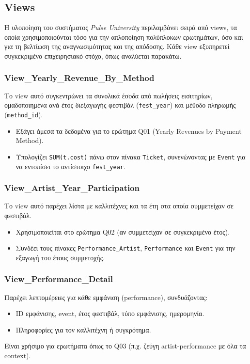 \documentclass[13pt]{extarticle}
\begin{document}
\subsection{Views}

Η υλοποίηση του συστήματος \textit{Pulse University} περιλαμβάνει σειρά από views, τα οποία χρησιμοποιούνται τόσο για την απλοποίηση πολύπλοκων ερωτημάτων, όσο και για τη βελτίωση της αναγνωσιμότητας και της απόδοσης. Κάθε view εξυπηρετεί συγκεκριμένο επιχειρησιακό στόχο, όπως αναλύεται παρακάτω.

\subsubsection{View\_Yearly\_Revenue\_By\_Method}

Το view αυτό συγκεντρώνει τα συνολικά έσοδα από πωλήσεις εισιτηρίων, ομαδοποιημένα ανά έτος διεξαγωγής φεστιβάλ (\texttt{fest\_year}) και μέθοδο πληρωμής (\texttt{method\_id}).

\begin{itemize}
    \item Εξάγει άμεσα τα δεδομένα για το ερώτημα Q01 (Yearly Revenues by Payment Method).
    \item Υπολογίζει \texttt{SUM(t.cost)} πάνω στον πίνακα \texttt{Ticket}, συνενώνοντας με \texttt{Event} για να εντοπίσει το αντίστοιχο \texttt{fest\_year}.
\end{itemize}

\subsubsection{View\_Artist\_Year\_Participation}

Το view αυτό παρέχει λίστα με καλλιτέχνες και τα έτη στα οποία συμμετείχαν σε φεστιβάλ.

\begin{itemize}
    \item Χρησιμοποιείται στο ερώτημα Q02 (αν συμμετείχαν σε συγκεκριμένο έτος).
    \item Συνδέει τους πίνακες \texttt{Performance\_Artist}, \texttt{Performance} και \texttt{Event} για την εξαγωγή του έτους συμμετοχής.
\end{itemize}

\subsubsection{View\_Performance\_Detail}

Παρέχει λεπτομέρειες για κάθε εμφάνιση (performance), συνδυάζοντας:
\begin{itemize}
    \item ID εμφάνισης, event, έτος φεστιβάλ, τύπο εμφάνισης, ημερομηνία.
    \item Πληροφορίες για τον καλλιτέχνη ή συγκρότημα.
\end{itemize}
Είναι χρήσιμο για ερωτήματα όπως το Q03 (π.χ. ζεύγη artist-performance με όλα τα context).
\end{document}

